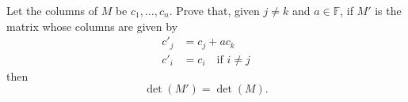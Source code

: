 \begin{exercise}
  \label{ex:hw05:column-addition}
  Let the columns of \(M\) be \(c_1,\ldots,c_n\). Prove that, given
  \(j\ne k\) and \(a\in\mathbb F\), if \(M'\) is the matrix whose
  columns are given by
  \[
    \begin{aligned}
      c'_j&=c_j+ac_k\\
      c'_i&=c_i\quad\text{if \(i\ne j\)}
    \end{aligned}
  \]
  then
  \[
    \det(M')=\det(M).
  \]
\end{exercise}
